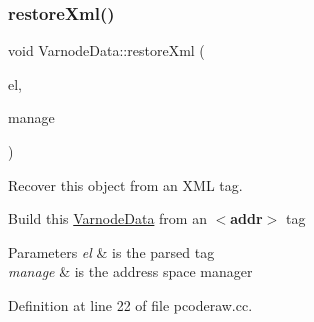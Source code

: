 \subsubsection{\texorpdfstring{restoreXml()}{restoreXml()}}
{\footnotesize\ttfamily void Varnode\+Data\+::restore\+Xml (\begin{DoxyParamCaption}\item[{const \mbox{\hyperlink{class_element}{Element}} $\ast$}]{el,  }\item[{const \mbox{\hyperlink{class_addr_space_manager}{Addr\+Space\+Manager}} $\ast$}]{manage }\end{DoxyParamCaption})}



Recover this object from an X\+ML tag. 

Build this \mbox{\hyperlink{struct_varnode_data}{Varnode\+Data}} from an {\bfseries{$<$addr$>$}} tag 
\begin{DoxyParams}{Parameters}
{\em el} & is the parsed tag \\
\hline
{\em manage} & is the address space manager \\
\hline
\end{DoxyParams}


Definition at line 22 of file pcoderaw.\+cc.

